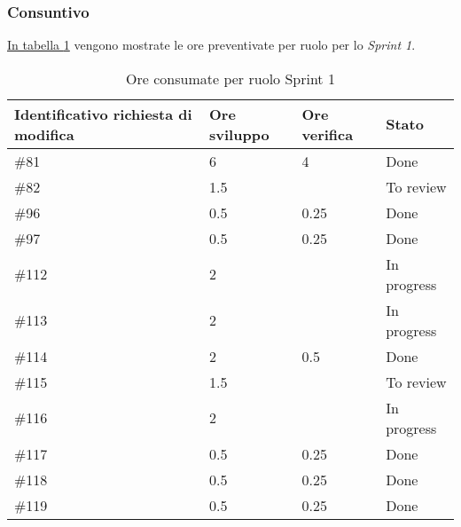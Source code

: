 \subsubsection{Consuntivo}

\hyperref[tab:sprint1_ore_consumate]{In tabella \ref{tab:sprint1_ore_consumate}} vengono mostrate le ore preventivate per ruolo per lo \textit{Sprint 1}.

\begin{table}[!h]
    \centering
        \begin{tabular}{| l | l | l | l |}
            \hline
                \textbf{Identificativo richiesta di modifica} & 
                \textbf{Ore sviluppo} &
                \textbf{Ore verifica} & 
                \textbf{Stato}\\ 
    \hline
        \#81 & 6 & 4 & Done\\
    \hline
        \#82 & 1.5 &  & To review\\
    \hline
        \#96 & 0.5 & 0.25 & Done\\
    \hline
        \#97 & 0.5 & 0.25 & Done\\
    \hline
        \#112 & 2 & & In progress\\
    \hline
        \#113 & 2 & & In progress\\
    \hline
        \#114 & 2 & 0.5 & Done\\
    \hline
        \#115 & 1.5 & & To review\\
    \hline
        \#116 & 2 & & In progress\\
    \hline
        \#117 & 0.5 & 0.25 & Done\\
    \hline
        \#118 & 0.5 & 0.25 & Done\\
    \hline
        \#119 & 0.5 & 0.25 & Done\\
    \hline
    \end{tabular}
    \caption{Ore consumate per ruolo Sprint 1}
    \label{tab:sprint1_ore_consumate} 
\end{table}